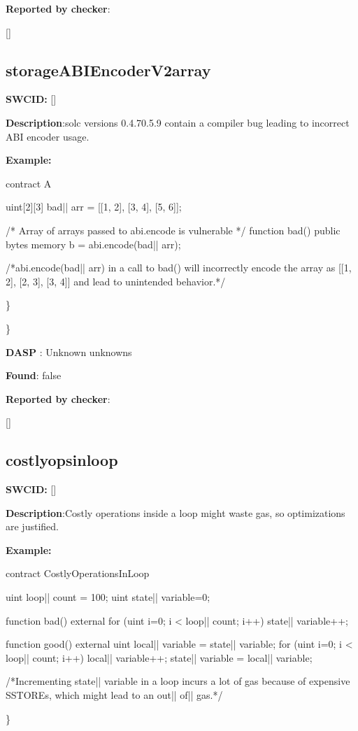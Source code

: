 \documentclass{article}
\begin{document}
\textbf{Reported by checker}: 
\begin{ffcode} 

[]
\end{ffcode} 
\subsection{storage{\textunderscore}ABIEncoderV2{\textunderscore}array} 
\textbf{SWC{\textunderscore}ID:} []

\textbf{Description}:solc versions 0.4.7{\textendash}0.5.9 contain a compiler bug leading to incorrect ABI encoder usage.


\textbf{Example:} 
\begin{ffcode} 

contract A {
    uint[2][3] bad|\textunderscore| arr = [[1, 2], [3, 4], [5, 6]];

    /* Array of arrays passed to abi.encode is vulnerable */
    function bad() public {
        bytes memory b = abi.encode(bad|\textunderscore| arr);
    }
}

 /*abi.encode(bad|\textunderscore| arr) in a call to bad() will incorrectly encode the array as [[1, 2], [2, 3], [3, 4]] and lead to unintended behavior.*/ 

\end{ffcode} 
\} 

\} 

\textbf{DASP} : Unknown unknowns

\textbf{Found}: false

\textbf{Reported by checker}: 
\begin{ffcode} 

[]
\end{ffcode} 
\subsection{costly{\textunderscore}ops{\textunderscore}in{\textunderscore}loop} 
\textbf{SWC{\textunderscore}ID:} []

\textbf{Description}:Costly operations inside a loop might waste gas, so optimizations are justified.


\textbf{Example:} 
\begin{ffcode} 

contract CostlyOperationsInLoop{

    uint loop|\textunderscore| count = 100;
    uint state|\textunderscore| variable=0;

    function bad() external{
        for (uint i=0; i < loop|\textunderscore| count; i++){
            state|\textunderscore| variable++;
        }
    }

    function good() external{
      uint local|\textunderscore| variable = state|\textunderscore| variable;
      for (uint i=0; i < loop|\textunderscore| count; i++){
        local|\textunderscore| variable++;
      }
      state|\textunderscore| variable = local|\textunderscore| variable;
    }
}
 /*Incrementing state|\textunderscore| variable in a loop incurs a lot of gas because of expensive SSTOREs, which might lead to an out|\textendash| of|\textendash| gas.*/ 

\end{ffcode} 
\} 
\end{document}
